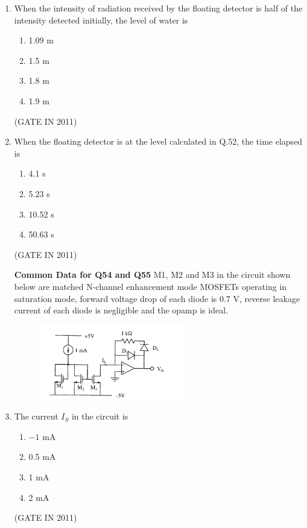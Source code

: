 \documentclass[journal]{IEEEtran}
\begin{document}
\begin{enumerate}
\item When the intensity of radiation received by the floating detector is half of the intensity detected initially, the level of water is

\begin{multicols}{4}
\begin{enumerate}
\item 1.09 m
\item 1.5 m
\item 1.8 m
\item 1.9 m
\end{enumerate}
\end{multicols} \hfill(GATE IN 2011)

\item When the floating detector is at the level calculated in Q.52, the time elapsed is

\begin{multicols}{4}
\begin{enumerate}
\item 4.1 s
\item 5.23 s
\item 10.52 s
\item 50.63 s
\end{enumerate}
\end{multicols} \hfill(GATE IN 2011)

\textbf{Common Data for Q54 and Q55}
M1, M2 and M3 in the circuit shown below are matched N-channel enhancement mode MOSFETs operating in saturation mode, forward voltage drop of each diode is 0.7 V, reverse leakage current of each diode is negligible and the opamp is ideal.
\begin{figure}[H]
    \centering
      \includegraphics[width=0.6\textwidth]{19.png} 
      \caption{}
    \label{fig:fig19} 
\end{figure}

\item The current $I_S$ in the circuit is

\begin{multicols}{4}
\begin{enumerate}
\item $-1$ mA
\item 0.5 mA
\item 1 mA
\item 2 mA
\end{enumerate}
\end{multicols} \hfill(GATE IN 2011)


\end{enumerate}
\end{document}
